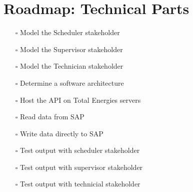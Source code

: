 \section*{Roadmap: Technical Parts}
\begin{itemize}
	\item[\rlap{\raisebox{0.3ex}{\hspace{0.4ex}\tiny \ding{52}}}$\square$] Model the Scheduler stakeholder 
	\item[\rlap{\raisebox{0.3ex}{\hspace{0.4ex}\tiny \ding{52}}}$\square$] Model the Supervisor stakeholder 
	\item[\rlap{\raisebox{0.3ex}{\hspace{0.4ex}\tiny \ding{52}}}$\square$] Model the Technician stakeholder 
	\item[\rlap{\raisebox{0.3ex}{\hspace{0.4ex}\tiny \ding{52}}}$\square$] Determine a software architecture
	\item[\rlap{\raisebox{0.3ex}{\hspace{0.4ex}\tiny \ding{52}}}$\square$] Host the API on Total Energies servers
	\item[\rlap{\raisebox{0.3ex}{\hspace{0.4ex}\tiny \ding{52}}}$\square$] Read data from SAP
	\item[$\square$] Write data directly to SAP
	\item[\rlap{\raisebox{0.3ex}{\hspace{0.4ex}\tiny \ding{52}}}$\square$] Test output with scheduler stakeholder
	\item[$\square$] Test output with supervisor stakeholder
	\item[$\square$] Test output with technicial stakeholder
\end{itemize}
